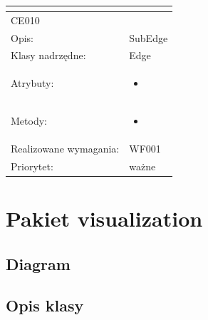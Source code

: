 \documentclass[a4paper,10pt]{article}
\begin{document}
\begin{center}
\begin{longtable}{|m{3cm}|m{9cm}|}
\multicolumn{2}{c}{} \\
 \hline

CE010 &  \\ \hline
Opis: & SubEdge    \\ \hline
Klasy nadrzędne: & Edge    \\ \hline
Atrybuty: & \begin{itemize}
 \item 
\end{itemize}
 \\ \hline
Metody: & \begin{itemize}
 \item 
\end{itemize}
  \\ \hline
Realizowane wymagania: & WF001 \\ \hline
Priorytet: & ważne  \\ \hline



\end{longtable}

\end{center}

\section{Pakiet visualization }

\subsection{Diagram}


\subsection{Opis klasy}
\end{document}

